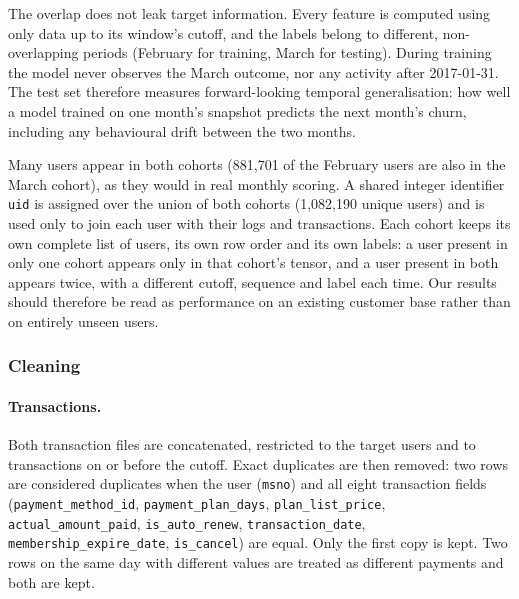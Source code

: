 \documentclass{article}
\begin{document}
The overlap does not leak target information. Every feature is computed using only data up to its window's cutoff, and the labels belong to different, non-overlapping periods (February for training, March for testing). During training the model never observes the March outcome, nor any activity after 2017-01-31. The test set therefore measures forward-looking temporal generalisation: how well a model trained on one month's snapshot predicts the next month's churn, including any behavioural drift between the two months.

Many users appear in both cohorts (881{,}701 of the February users are also in the March cohort), as they would in real monthly scoring. A shared integer identifier \texttt{uid} is assigned over the union of both cohorts (1{,}082{,}190 unique users) and is used only to join each user with their logs and transactions. Each cohort keeps its own complete list of users, its own row order and its own labels: a user present in only one cohort appears only in that cohort's tensor, and a user present in both appears twice, with a different cutoff, sequence and label each time. Our results should therefore be read as performance on an existing customer base rather than on entirely unseen users.

\subsubsection{Cleaning}

\paragraph{Transactions.} Both transaction files are concatenated, restricted to the target users and to transactions on or before the cutoff. Exact duplicates are then removed: two rows are considered duplicates when the user (\texttt{msno}) and all eight transaction fields (\texttt{payment\_method\_id}, \texttt{payment\_plan\_days}, \texttt{plan\_list\_price}, \texttt{actual\_amount\_paid}, \texttt{is\_auto\_renew}, \texttt{transaction\_date}, \texttt{membership\_expire\_date}, \texttt{is\_cancel}) are equal. Only the first copy is kept. Two rows on the same day with different values are treated as different payments and both are kept.
\end{document}
